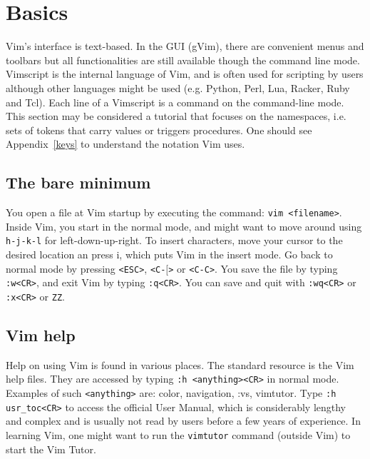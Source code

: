 \documentclass{article}
\newcommand{\ttt}[1] {
	\texttt{<#1>}}
\newcommand{\tttt}[1]{\texttt{#1}}
\begin{document}
\section{Basics}\label{basics}
Vim's interface is text-based.
In the GUI (gVim),
there are convenient menus and toolbars
but all functionalities are still available though
the command line mode.
Vimscript is the internal language of Vim,
and is often used for scripting by users
although other languages might be used 
(e.g. Python, Perl, Lua, Racker, Ruby and Tcl). 
Each line of a Vimscript is a command on the
command-line mode.
This section may be considered a tutorial
that focuses on the namespaces, i.e. sets of tokens
that carry values or triggers procedures.
One should see Appendix~\ref{keys}
to understand the notation Vim uses.

\subsection{The bare minimum}\label{minimum}
You open a file at Vim startup by executing
the command: \texttt{vim <filename>}.
Inside Vim, you start in the normal
mode, and might want to move around using
\texttt{h-j-k-l} for left-down-up-right.
To insert characters, move your
cursor to the desired location an press i,
which puts Vim in the insert mode.
Go back to normal mode by pressing
\texttt{<ESC>}, \ttt{C-$[$} or \texttt{<C-C>}.
You save the file by typing \texttt{:w<CR>},
and exit Vim by typing \texttt{:q<CR>}.
You can save and quit with \tttt{:wq<CR>}
or \tttt{:x<CR>} or \tttt{ZZ}.

\subsection{Vim help}
Help on using Vim is found in various places.
The standard resource is the Vim help files.
They are accessed by typing \texttt{:h <anything><CR>}
in normal mode.
Examples of such \texttt{<anything>} are:
color, navigation, :vs, vimtutor.
Type 
\texttt{:h usr\_toc<CR>}
to access the official User Manual,
which is considerably lengthy and complex
and is usually not read by users before a few years
of experience.
In learning Vim, one
might want to run the \texttt{vimtutor} command
(outside Vim) to start the Vim Tutor.
\end{document}
